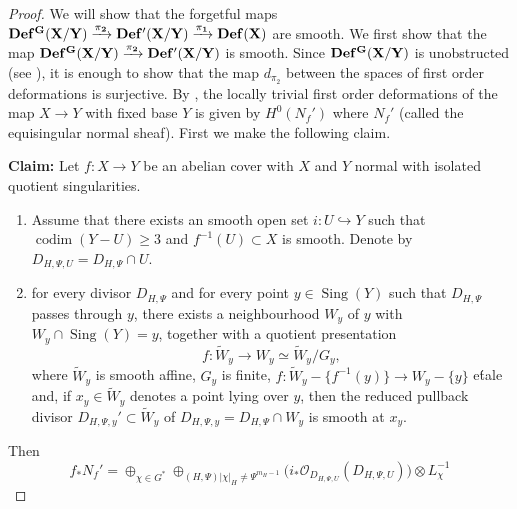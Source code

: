 \documentclass[12pt,twoside,]{amsart}
\theoremstyle{plain}
\theoremstyle{definition}
\begin{document}

\begin{proof}
We will show that the forgetful maps $\bf Def^G(X/Y) \xrightarrow{\pi_2} \bf Def'(X/Y) \xrightarrow{\pi_1} \bf Def(X)$ are smooth. We first show that the map $\bf Def^G(X/Y) \xrightarrow{\pi_2} \bf Def'(X/Y)$ is smooth. Since $\bf Def^G(X/Y)$ is unobstructed (see ), it is enough to show that the map $d_{\pi_2}$ between the spaces of first order deformations is surjective. By , the locally trivial first order deformations of the map $X \to Y$ with fixed base $Y$ is given by $H^0(N_f')$ where $N_f'$ (called the equisingular normal sheaf). First we make the following claim.

\textbf{Claim:}
    Let $f : X \to Y$ be an abelian cover with $X$ and $Y$ normal with isolated quotient singularities. 
    \begin{enumerate}
        \item Assume that there exists an smooth open set $i: U \hookrightarrow Y$ such that $\operatorname{codim}(Y-U) \geq 3$ and $f^{-1}(U) \subset X$ is smooth. Denote by $D_{H,\Psi, U} = D_{H,\Psi} \cap U$.

        \item for every divisor $D_{H,\Psi}$ and for every point
        $y\in \operatorname{Sing}(Y)$ such that $D_{H,\Psi}$ passes through $y$, there exists a neighbourhood $W_y$ of $y$ with $W_y \cap \operatorname{Sing}(Y) = y$, together with a
        quotient presentation
       \[
       f: \widetilde{W}_y \to W_y \simeq \widetilde{W}_y/G_y,
       \]
       where $\widetilde{W}_y$ is smooth affine, $G_y$ is finite, $f: \widetilde{W}_y- \{f^{-1}(y)\} \to W_y- \{y\}$ e\'tale
        and, if  $x_y\in \widetilde{W}_y$ denotes a point lying over $y$, then the reduced pullback
        divisor $D_{H,\Psi,y}'\subset \widetilde{W}_y$ of $D_{H,\Psi,y} = D_{H,\Psi} \cap W_y$  is smooth at $x_y$.
    \end{enumerate}
      Then 
    $$f_*N_f' = \oplus_{\chi \in G^*} \oplus_{(H,\Psi)| \chi|_H \neq \Psi^{m_H-1}} \big(i_*\mathcal{O}_{D_{H,\Psi, U}}(D_{H,\Psi, U})\big) \otimes L_{\chi}^{-1}$$


\end{proof}
\end{document}
